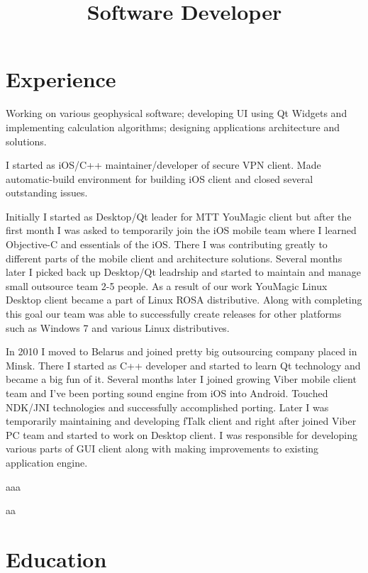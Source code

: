 \documentclass[11pt, a4paper]{moderncv}
\title{Software Developer}
\begin{document}
 
\maketitle

\section{Experience}

{
Working on various geophysical software; 
developing UI using Qt Widgets and implementing calculation algorithms; 
designing applications architecture and solutions.
}

{
I started as iOS/C++ maintainer/developer of secure VPN client.
Made automatic-build environment for building iOS client and closed several outstanding issues.
}

{
Initially I started as Desktop/Qt leader for MTT YouMagic client but after the first month I was asked to temporarily join the iOS mobile team where  
I learned Objective-C and essentials of the iOS. There I was contributing greatly to different parts of the mobile client and architecture solutions.
Several months later I picked back up Desktop/Qt leadrship and started to maintain and manage small outsource team 2-5 people. 
As a result of our work YouMagic Linux Desktop client became a part of Linux ROSA distributive.
Along with completing this goal our team was able to successfully create releases for other platforms such as Windows 7 and various Linux distributives.
}

{
In 2010 I moved to Belarus and joined pretty big outsourcing company placed in Minsk. 
There I started as C++ developer and started to learn Qt technology and became a big fun of it.
Several months later I joined growing Viber mobile client team and I've been porting sound engine from iOS into Android. 
Touched NDK/JNI technologies and successfully accomplished porting.
Later I was temporarily maintaining and developing fTalk client and right after joined Viber PC team and started to work on Desktop client.
I was responsible for developing various parts of GUI client along with making improvements to existing application engine.
}

{
aaa
}

{
aa
}

\section{Education}

 
 
\end{document}
